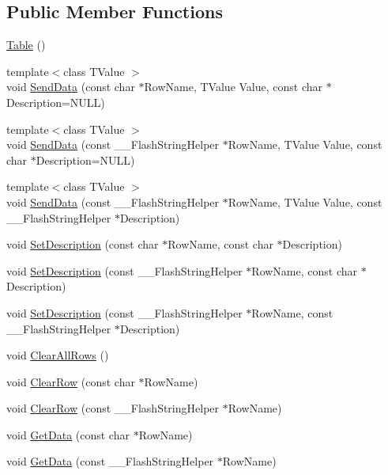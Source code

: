 \subsection*{Public Member Functions}
\begin{DoxyCompactItemize}
\item 
\hyperlink{class_table_a049f2e06391781ae255c6698869c4ad1}{Table} ()
\item 
{\footnotesize template$<$class T\-Value $>$ }\\void \hyperlink{class_table_ab690acb0fa054a84ff8727e2189b2ced}{Send\-Data} (const char $\ast$Row\-Name, T\-Value Value, const char $\ast$Description=N\-U\-L\-L)
\item 
{\footnotesize template$<$class T\-Value $>$ }\\void \hyperlink{class_table_aeabd5feb5694c2bce775112ba9061cc0}{Send\-Data} (const \-\_\-\-\_\-\-Flash\-String\-Helper $\ast$Row\-Name, T\-Value Value, const char $\ast$Description=N\-U\-L\-L)
\item 
{\footnotesize template$<$class T\-Value $>$ }\\void \hyperlink{class_table_ae4be3ece598bebfbd7bccb4536dc9774}{Send\-Data} (const \-\_\-\-\_\-\-Flash\-String\-Helper $\ast$Row\-Name, T\-Value Value, const \-\_\-\-\_\-\-Flash\-String\-Helper $\ast$Description)
\item 
void \hyperlink{class_table_a600586ccc55e35c30513b2f99f6eb9a7}{Set\-Description} (const char $\ast$Row\-Name, const char $\ast$Description)
\item 
void \hyperlink{class_table_a4cdc76e7213b2142b0e0666d43e0bc30}{Set\-Description} (const \-\_\-\-\_\-\-Flash\-String\-Helper $\ast$Row\-Name, const char $\ast$Description)
\item 
void \hyperlink{class_table_a4c326302694a20dcf72b9c71875594f5}{Set\-Description} (const \-\_\-\-\_\-\-Flash\-String\-Helper $\ast$Row\-Name, const \-\_\-\-\_\-\-Flash\-String\-Helper $\ast$Description)
\item 
void \hyperlink{class_table_a7b05dffc8734218985fcfda025aea470}{Clear\-All\-Rows} ()
\item 
void \hyperlink{class_table_aaf363885b1cada63941e6688deb255d0}{Clear\-Row} (const char $\ast$Row\-Name)
\item 
void \hyperlink{class_table_af7b147319cc0859f8a7e6f30291d73a8}{Clear\-Row} (const \-\_\-\-\_\-\-Flash\-String\-Helper $\ast$Row\-Name)
\item 
void \hyperlink{class_table_ae6b123b1f503f1be9bb8eb8366ce6e98}{Get\-Data} (const char $\ast$Row\-Name)
\item 
void \hyperlink{class_table_aca9e977e7875fc10207680183cad8806}{Get\-Data} (const \-\_\-\-\_\-\-Flash\-String\-Helper $\ast$Row\-Name)
\end{DoxyCompactItemize}
